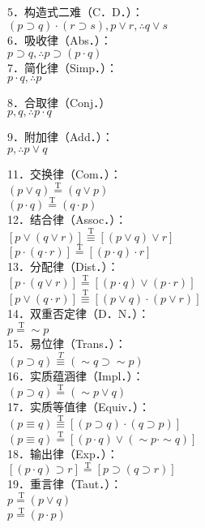 5．构造式二难（C．D．）：\\
$(p \supset q) \cdot(r \supset s), p \vee r, \therefore q \vee s$\\
6．吸收律（Abs．）：\\
$p \supset q, \therefore p \supset(p \cdot q)$\\
7．简化律（Simp．）：\\
$p \cdot q, \therefore p$

8．合取律（Conj．）\\
$p, q, \therefore p \cdot q$

9．附加律（Add．）：\\
$p, \therefore p \vee q$

11．交换律（Com．）：\\
$(p \vee q) \stackrel{\mathrm{T}}{=}(q \vee p)$\\
$(p \cdot q) \stackrel{\mathrm{T}}{=}(q \cdot p)$\\
12．结合律（Assoc．）：\\
$[p \vee(q \vee r)] \stackrel{\mathrm{T}}{\equiv}[(p \vee q) \vee r]$\\
$[p \cdot(q \cdot r)] \stackrel{\mathrm{T}}{=}[(p \cdot q) \cdot r]$\\
13．分配律（Dist．）：\\
$[p \cdot(q \vee r)] \stackrel{\mathrm{T}}{=}[(p \cdot q) \vee(p \cdot r)]$\\
$[p \vee(q \cdot r)] \stackrel{\mathrm{T}}{\equiv}[(p \vee q) \cdot(p \vee r)]$\\
14．双重否定律（D．N．）：\\
$p \stackrel{\mathrm{~T}}{=} \sim p$\\
15．易位律（Trans．）：\\
$(p \supset q) \stackrel{T}{\equiv}(\sim q \supset \sim p)$\\
16．实质蕴涵律（Impl．）：\\
$(p \supset q) \stackrel{\mathrm{T}}{=}(\sim p \vee q)$\\
17．实质等值律（Equiv．）：\\
$(p \equiv q) \stackrel{\mathrm{T}}{\equiv}[(p \supset q) \cdot(q \supset p)]$\\
$(p \equiv q) \stackrel{\mathrm{T}}{=}[(p \cdot q) \vee(\sim p \cdot \sim q)]$\\
18．输出律（Exp．）：\\
$[(p \cdot q) \supset r] \stackrel{\mathrm{T}}{=}[p \supset(q \supset r)]$\\
19．重言律（Taut．）：\\
$p \stackrel{\mathrm{~T}}{=}(p \vee q)$\\
$p \stackrel{\mathrm{~T}}{=}(p \cdot p)$

